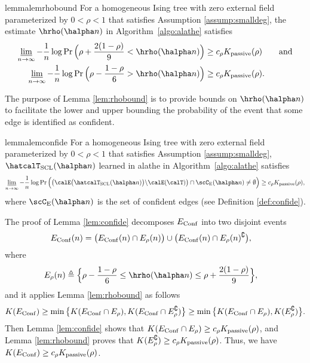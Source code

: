 \documentclass[11pt,onecolumn]{article}
\newcommand{\Passive}{{\rm passive}}
\begin{document}
\begin{restatable}{lemma}{lemrhobound}
\label{lem:rhobound}
For a homogeneous Ising tree with zero external field parameterized by $0<\rho<1$ that satisfies Assumption \ref{assump:smalldeg}, the estimate $\hrho(\halpha n)$ in Algorithm~\ref{algo:alathe} satisfies 
\begin{align}
	\varliminf_{n\rightarrow\infty}-\frac{1}{n}\log\Pr\Big(\rho+\frac{2(1-\rho)}{9}<\hrho(\halpha n)\Big)&\geq c_{\rho}K _{\Passive}(\rho)\qquad\mbox{and}\\ \varliminf_{n\rightarrow\infty}-\frac{1}{n}\log\Pr\Big(\rho-\frac{1-\rho}{6}>\hrho(\halpha n)\Big)&\geq c_{\rho}K _{\Passive}(\rho).
\end{align}
\end{restatable}
The purpose of Lemma \ref{lem:rhobound} is to provide   bounds on $\hrho(\halpha n)$ to facilitate the  lower  and upper bounding the probability of the event that some edge is identified as confident.
\begin{restatable}{lemma}{lemconfide}
\label{lem:confide}
For a homogeneous Ising tree with zero external field parameterized by $0<\rho<1$ that satisfies Assumption \ref{assump:smalldeg}, $\hatcalT_{\rm{SCL}}(\halpha n)$ learned in  \ac{alathe} in Algorithm~\ref{algo:alathe} satisfies
\begin{align} 
	\varliminf_{n\rightarrow\infty}-\frac{1}{n}\log\Pr\Big(\big(\calE\big(\hatcalT_{\rm{SCL}}(\halpha n)\big)\backslash \calE(\calT)\big)\cap \scC_{\mathrm{E}}(\halpha n)\neq \emptyset\Big)\geq c_{\rho}K _{\Passive}(\rho),\label{ieq:confide}
\end{align}
where $\scC_{\mathrm{E}}(\halpha n)$ is the set of confident edges (see Definition \ref{def:confide}). 
\end{restatable}
The proof of Lemma \ref{lem:confide} decomposes $E_{{\rm Conf}}$ into two disjoint events
\begin{align}
	E_{{\rm Conf}}(n)&=\big(E_{{\rm Conf}}(n)\cap E_{\rho}(n)\big)\cup\big(E_{{\rm Conf}}(n)\cap E_{\rho}(n)^{\complement}\big),
\end{align}
where 
\begin{align}
	E_{\rho}(n)&\triangleq\Big\{\rho-\frac{1-\rho}{6}\leq\hrho(\halpha n)\leq\rho+\frac{2(1-\rho)}{9}\Big\},
\end{align}
and it applies  Lemma \ref{lem:rhobound} as follows
\begin{align}
    K (E_{{\rm Conf}})\geq\min \big\{K (E_{{\rm Conf}}\cap E_{\rho}),K (E_{{\rm Conf}}\cap E_{\rho}^{\complement})\big\}\geq \min \big\{K (E_{{\rm Conf}}\cap E_{\rho}),K (E_{\rho}^{\complement})\big\}.
\end{align}
Then Lemma \ref{lem:confide} shows that $K (E_{{\rm Conf}}\cap E_{\rho})\geq c_{\rho}K _{\Passive}(\rho)$, and Lemma \ref{lem:rhobound} proves that $K (E_{\rho}^{\complement})\geq c_{\rho}K _{\Passive}(\rho)$. Thus, we have $K (E_{{\rm Conf}})\geq c_{\rho}K _{\Passive}(\rho)$.
\end{document}
